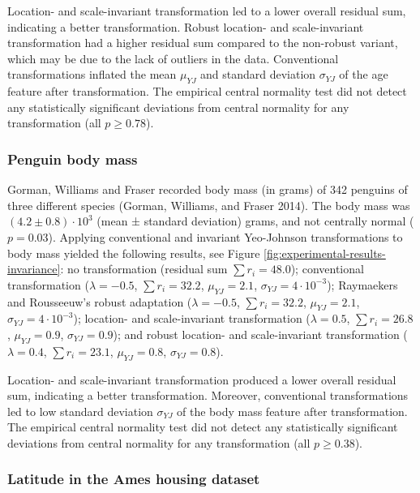 \documentclass[
  a4paper,
]{article}
\begin{document}
Location- and scale-invariant transformation led to a lower overall
residual sum, indicating a better transformation. Robust location- and
scale-invariant transformation had a higher residual sum compared to the
non-robust variant, which may be due to the lack of outliers in the
data. Conventional transformations inflated the mean \(\mu_{YJ}\) and
standard deviation \(\sigma_{YJ}\) of the age feature after
transformation. The empirical central normality test did not detect any
statistically significant deviations from central normality for any
transformation (all \(p \geq 0.78\)).

\subsubsection{Penguin body mass}\label{penguin-body-mass}

Gorman, Williams and Fraser recorded body mass (in grams) of 342
penguins of three different species (Gorman, Williams, and Fraser 2014).
The body mass was \((4.2 \pm 0.8) \cdot 10^3\) (mean ± standard
deviation) grams, and not centrally normal (\(p = 0.03\)). Applying
conventional and invariant Yeo-Johnson transformations to body mass
yielded the following results, see Figure
\ref{fig:experimental-results-invariance}: no transformation (residual
sum \(\sum r_i = 48.0\)); conventional transformation
(\(\lambda = -0.5\), \(\sum r_i = 32.2\), \(\mu_{YJ} = 2.1\),
\(\sigma_{YJ} = 4 \cdot 10^{-3}\)); Raymaekers and Rousseeuw's robust
adaptation (\(\lambda = -0.5\), \(\sum r_i = 32.2\), \(\mu_{YJ} = 2.1\),
\(\sigma_{YJ} = 4 \cdot 10^{-3}\)); location- and scale-invariant
transformation (\(\lambda = 0.5\), \(\sum r_i = 26.8\),
\(\mu_{YJ} = 0.9\), \(\sigma_{YJ} = 0.9\)); and robust location- and
scale-invariant transformation (\(\lambda = 0.4\), \(\sum r_i = 23.1\),
\(\mu_{YJ} = 0.8\), \(\sigma_{YJ} = 0.8\)).

Location- and scale-invariant transformation produced a lower overall
residual sum, indicating a better transformation. Moreover, conventional
transformations led to low standard deviation \(\sigma_{YJ}\) of the
body mass feature after transformation. The empirical central normality
test did not detect any statistically significant deviations from
central normality for any transformation (all \(p \geq 0.38\)).

\subsubsection{Latitude in the Ames housing
dataset}\label{latitude-in-the-ames-housing-dataset}
\end{document}
